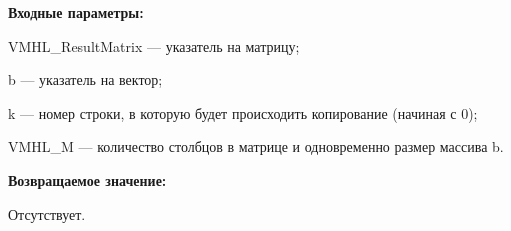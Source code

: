\textbf{Входные параметры:}  
 
VMHL\_ResultMatrix --- указатель на матрицу;
 
b --- указатель на вектор;
 
k --- номер строки, в которую будет происходить копирование (начиная с 0);
 
VMHL\_M --- количество столбцов в матрице и одновременно размер массива b.

\textbf{Возвращаемое значение:}

Отсутствует.